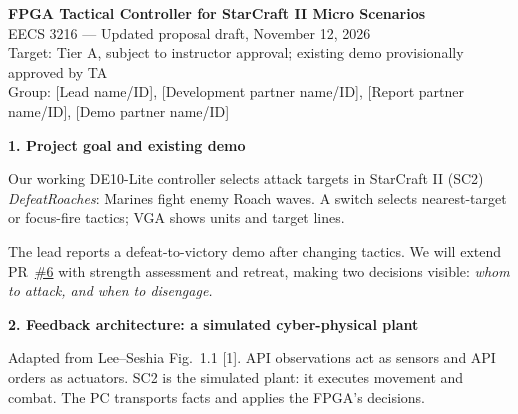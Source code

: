 \documentclass[10pt,letterpaper]{article}
\newcommand{\heading}[1]{\par\vspace{4pt}\textbf{#1}\par}
\begin{document}
\begin{center}
{\large\bfseries FPGA Tactical Controller for StarCraft II Micro Scenarios}\\[3pt]
{\small EECS 3216 --- Updated proposal draft, November 12, 2026\\
Target: Tier A, subject to instructor approval; existing demo provisionally approved by TA\\
Group: [Lead name/ID], [Development partner name/ID], [Report partner name/ID], [Demo partner name/ID]}
\end{center}
\vspace{-5pt}
\normalsize
\heading{1. Project goal and existing demo}
Our working DE10-Lite controller selects attack targets in StarCraft II (SC2) \emph{DefeatRoaches}: Marines fight enemy Roach waves. A switch selects nearest-target or focus-fire tactics; VGA shows units and target lines.

The lead reports a defeat-to-victory demo after changing tactics. We will extend PR~\href{https://github.com/poroburu/eecs3216-fpga-sc2-tactics/pull/6}{\#6} with strength assessment and retreat, making two decisions visible: \emph{whom to attack, and when to disengage.}

\heading{2. Feedback architecture: a simulated cyber-physical plant}
\begin{center}
\end{center}
\vspace{-6pt}
Adapted from Lee--Seshia Fig.~1.1 [1]. API observations act as sensors and API orders as actuators. SC2 is the simulated plant: it executes movement and combat. The PC transports facts and applies the FPGA's decisions.
\end{document}

